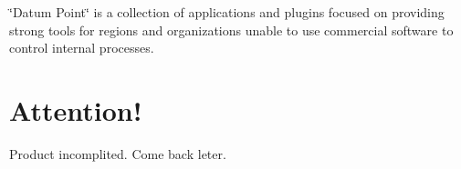 \char`\"{}\+Datum Point\char`\"{} is a collection of applications and plugins focused on providing strong tools for regions and organizations unable to use commercial software to control internal processes.

\section*{Attention!}

Product incomplited. Come back leter. 